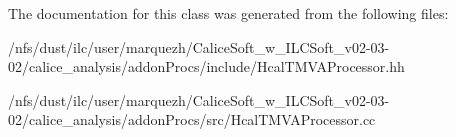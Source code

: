 The documentation for this class was generated from the following files\-:\begin{DoxyCompactItemize}
\item 
/nfs/dust/ilc/user/marquezh/\-Calice\-Soft\-\_\-w\-\_\-\-I\-L\-C\-Soft\-\_\-v02-\/03-\/02/calice\-\_\-analysis/addon\-Procs/include/Hcal\-T\-M\-V\-A\-Processor.\-hh\item 
/nfs/dust/ilc/user/marquezh/\-Calice\-Soft\-\_\-w\-\_\-\-I\-L\-C\-Soft\-\_\-v02-\/03-\/02/calice\-\_\-analysis/addon\-Procs/src/Hcal\-T\-M\-V\-A\-Processor.\-cc\end{DoxyCompactItemize}
